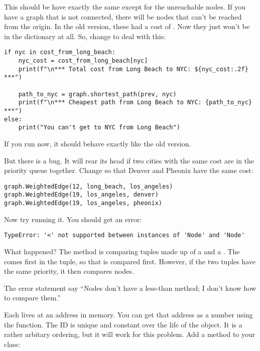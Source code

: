 This should be have exactly the same except for the unreachable nodes.
If you have a graph that is not connected, there will be nodes that
can't be reached from the origin.  In the old version, these had a
cost of .  Now they just won't be in the dictionary at all.  So, change  to deal with this:

\begin{verbatim}
if nyc in cost_from_long_beach:
    nyc_cost = cost_from_long_beach[nyc]
    print(f"\n*** Total cost from Long Beach to NYC: ${nyc_cost:.2f} ***")

    path_to_nyc = graph.shortest_path(prev, nyc)
    print(f"\n*** Cheapest path from Long Beach to NYC: {path_to_nyc} ***")
else:
    print("You can't get to NYC from Long Beach")
\end{verbatim}

If you run  now, it should behave exactly like the old version.

But there is a bug. It will rear its head if two cities with the same
cost are in the priority queue together.  Change 
so that Denver and Pheonix have the same cost:

\begin{verbatim}
graph.WeightedEdge(12, long_beach, los_angeles)
graph.WeightedEdge(19, los_angeles, denver)
graph.WeightedEdge(19, los_angeles, pheonix)
\end{verbatim}

Now try running it.  You should get an error:

\begin{verbatim}
TypeError: '<' not supported between instances of 'Node' and 'Node'
\end{verbatim}

What happened? The  method is comparing
tuples made up of a  and a .  The
 comes first in the tuple, so that is compared
first. However, if the two tuples have the same priority, it then
compares nodes.

The error statement say ``Nodes don't have a less-than method; I don't
know how to compare them.''

Each  lives at an address in memory. You can get that
address as a number using the  function. The ID is
unique and constant over the life of the object. It is a rather
arbitary ordering, but it will work for this problem.  Add a method to
your  class:

